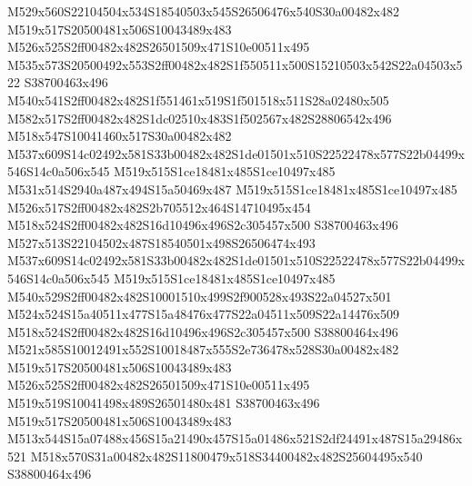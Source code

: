 \documentclass{article}
\begin{document}
\begin{multicols}{2}
M529x560S22104504x534S18540503x545S26506476x540S30a00482x482 M519x517S20500481x506S10043489x483 M526x525S2ff00482x482S26501509x471S10e00511x495 M535x573S20500492x553S2ff00482x482S1f550511x500S15210503x542S22a04503x522 S38700463x496 M540x541S2ff00482x482S1f551461x519S1f501518x511S28a02480x505 M582x517S2ff00482x482S1dc02510x483S1f502567x482S28806542x496 M518x547S10041460x517S30a00482x482 M537x609S14c02492x581S33b00482x482S1de01501x510S22522478x577S22b04499x546S14c0a506x545 M519x515S1ce18481x485S1ce10497x485 M531x514S2940a487x494S15a50469x487 M519x515S1ce18481x485S1ce10497x485 M526x517S2ff00482x482S2b705512x464S14710495x454 M518x524S2ff00482x482S16d10496x496S2c305457x500 S38700463x496 M527x513S22104502x487S18540501x498S26506474x493 M537x609S14c02492x581S33b00482x482S1de01501x510S22522478x577S22b04499x546S14c0a506x545 M519x515S1ce18481x485S1ce10497x485 M540x529S2ff00482x482S10001510x499S2f900528x493S22a04527x501 M524x524S15a40511x477S15a48476x477S22a04511x509S22a14476x509 M518x524S2ff00482x482S16d10496x496S2c305457x500 S38800464x496 M521x585S10012491x552S10018487x555S2e736478x528S30a00482x482 M519x517S20500481x506S10043489x483 M526x525S2ff00482x482S26501509x471S10e00511x495 M519x519S10041498x489S26501480x481 S38700463x496 M519x517S20500481x506S10043489x483 M513x544S15a07488x456S15a21490x457S15a01486x521S2df24491x487S15a29486x521 M518x570S31a00482x482S11800479x518S34400482x482S25604495x540 S38800464x496







\end{multicols}
\end{document}
